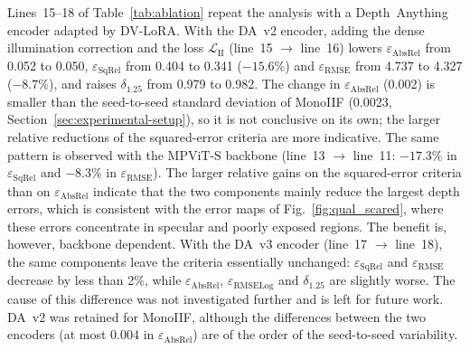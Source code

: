 \documentclass[a4paper,fleqn]{cas-dc}
\begin{document}
{
Lines~15--18 of Table~\ref{tab:ablation} repeat the analysis with a Depth~Anything encoder adapted by DV-LoRA. With the DA~v2 encoder, adding the dense illumination correction and the loss $\mathcal{L}_\textrm{II}$ (line~15 $\rightarrow$ line~16) lowers $\varepsilon_\textrm{AbsRel}$ from 0.052 to 0.050, $\varepsilon_\textrm{SqRel}$ from 0.404 to 0.341 ($-15.6\%$) and $\varepsilon_\textrm{RMSE}$ from 4.737 to 4.327 ($-8.7\%$), and raises $\delta_{1.25}$ from 0.979 to 0.982. The change in $\varepsilon_\textrm{AbsRel}$ (0.002) is smaller than the seed-to-seed standard deviation of MonoIIF (0.0023, Section~\ref{sec:experimental-setup}), so it is not conclusive on its own; the larger relative reductions of the squared-error criteria are more indicative. The same pattern is observed with the MPViT-S backbone (line~13 $\rightarrow$ line~11: $-17.3\%$ in $\varepsilon_\textrm{SqRel}$ and $-8.3\%$ in $\varepsilon_\textrm{RMSE}$). The larger relative gains on the squared-error criteria than on $\varepsilon_\textrm{AbsRel}$ indicate that the two components mainly reduce the largest depth errors, which is consistent with the error maps of Fig.~\ref{fig:qual_scared}, where these errors concentrate in specular and poorly exposed regions.
The benefit is, however, backbone dependent. With the DA~v3 encoder (line~17 $\rightarrow$ line~18), the same components leave the criteria essentially unchanged: $\varepsilon_\textrm{SqRel}$ and $\varepsilon_\textrm{RMSE}$ decrease by less than 2\%, while $\varepsilon_\textrm{AbsRel}$, $\varepsilon_\textrm{RMSELog}$ and $\delta_{1.25}$ are slightly worse. The cause of this difference was not investigated further and is left for future work. DA~v2 was retained for MonoIIF, although the differences between the two encoders (at most 0.004 in $\varepsilon_\textrm{AbsRel}$) are of the order of the seed-to-seed variability.}
\end{document}
